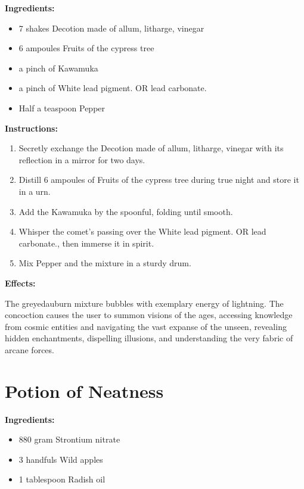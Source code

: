 \documentclass{article}
\begin{document}
\textbf{Ingredients:}

\begin{itemize}
  \item 7 shakes Decotion made of allum, litharge, vinegar
  \item 6 ampoules Fruits of the cypress tree
  \item a pinch of Kawamuka
  \item a pinch of White lead pigment. OR lead carbonate.
  \item Half a teaspoon Pepper
\end{itemize}

\textbf{Instructions:}

\begin{enumerate}
  \item Secretly exchange the Decotion made of allum, litharge, vinegar with its reflection in a mirror for two days.
  \item Distill 6 ampoules of Fruits of the cypress tree during true night and store it in a urn.
  \item Add the Kawamuka by the spoonful, folding until smooth.
  \item Whisper the comet’s passing over the White lead pigment. OR lead carbonate., then immerse it in spirit.
  \item Mix Pepper and the mixture in a sturdy drum.
\end{enumerate}

\textbf{Effects:}

The greyedauburn mixture bubbles with exemplary energy of lightning. The concoction causes the user to summon visions of the ages, accessing knowledge from cosmic entities and navigating the vast expanse of the unseen, revealing hidden enchantments, dispelling illusions, and understanding the very fabric of arcane forces.

\newpage
\section*{Potion of Neatness}

\textbf{Ingredients:}

\begin{itemize}
  \item 880 gram Strontium nitrate
  \item 3 handfuls Wild apples
  \item 1 tablespoon Radish oil
\end{itemize}
\end{document}
